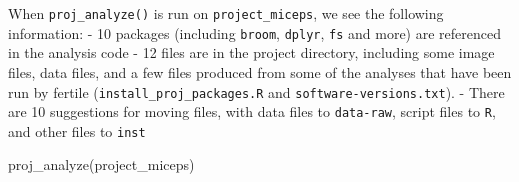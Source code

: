 \documentclass[12pt,twoside]{reedthesis}
\newenvironment{Shaded}{\begin{snugshade}}{\end{snugshade}}
\newcommand{\FunctionTok}[1]{\textcolor[rgb]{0.00,0.00,0.00}{#1}}
\newcommand{\NormalTok}[1]{#1}
\newcommand{\StringTok}[1]{\textcolor[rgb]{0.31,0.60,0.02}{#1}}
\begin{document}
When \texttt{proj\_analyze()} is run on \texttt{project\_miceps}, we see the following information:
- 10 packages (including \texttt{broom}, \texttt{dplyr}, \texttt{fs} and more) are referenced in the analysis code
- 12 files are in the project directory, including some image files, data files, and a few files produced from some of the analyses that have been run by fertile (\texttt{install\_proj\_packages.R} and \texttt{software-versions.txt}).
- There are 10 suggestions for moving files, with data files to \texttt{data-raw}, script files to \texttt{R}, and other files to \texttt{inst}
\begin{Shaded}
\begin{Highlighting}[]
\FunctionTok{proj\_analyze}\NormalTok{(}\StringTok{\textquotesingle{}project\_miceps\textquotesingle{}}\NormalTok{)}
\end{Highlighting}
\end{Shaded}
\footnotesize
\end{document}
